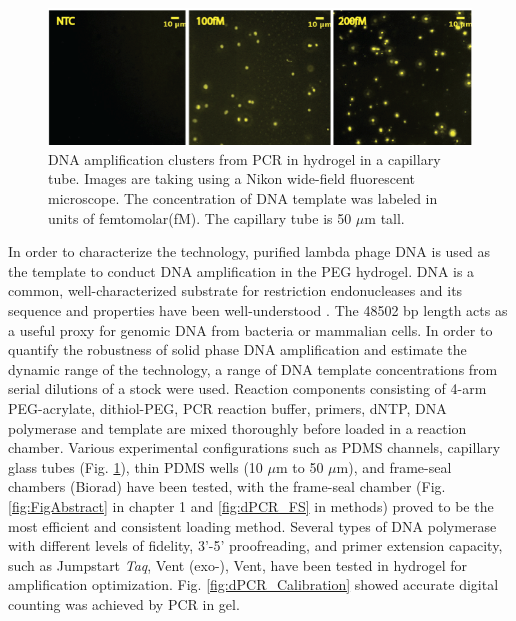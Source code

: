\begin{figure} 
\centering
\includegraphics[keepaspectratio,width=1\textwidth]{./figures/dPCR_Capillary.png}
\caption[DNA amplification clusters from PCR in hydrogel in a capillary tube.]{DNA amplification clusters from PCR in hydrogel in a capillary tube. Images are taking using a Nikon wide-field fluorescent microscope. The concentration of DNA template was labeled in units of femtomolar(fM). The capillary tube is 50 $\mu$m tall.}
\label{fig:dPCR_Cap}
\end{figure}

In order to characterize the technology, purified lambda phage DNA is used as the template to conduct DNA amplification in the PEG hydrogel. \textlambda DNA is a common, well-characterized substrate for restriction endonucleases and its sequence and properties have been well-understood \cite{Fu:2011wc, Robertson:2006gi}. The 48502 bp length acts as a useful proxy for genomic DNA from bacteria or mammalian cells. In order to quantify the robustness of solid phase DNA amplification and estimate the dynamic range of the technology, a range of DNA template concentrations from serial dilutions of a stock were used. Reaction components consisting of 4-arm PEG-acrylate, dithiol-PEG, PCR reaction buffer, primers, dNTP, DNA polymerase and template are mixed thoroughly before loaded in a reaction chamber. Various experimental configurations such as PDMS channels, capillary glass tubes (Fig. \ref{fig:dPCR_Cap}), thin PDMS wells (10 $\mu$m to 50 $\mu$m), and frame-seal chambers (Biorad) have been tested, with the frame-seal chamber (Fig. \ref{fig:FigAbstract} in chapter 1 and \ref{fig:dPCR_FS} in methods) proved to be the most efficient and consistent loading method. Several types of DNA polymerase with different levels of fidelity, 3'-5' proofreading, and primer extension capacity, such as Jumpstart \textit{Taq}, Vent (exo-), Vent, have been tested in hydrogel for amplification optimization. Fig. \ref{fig:dPCR_Calibration} showed accurate digital counting was achieved by PCR in gel. 

